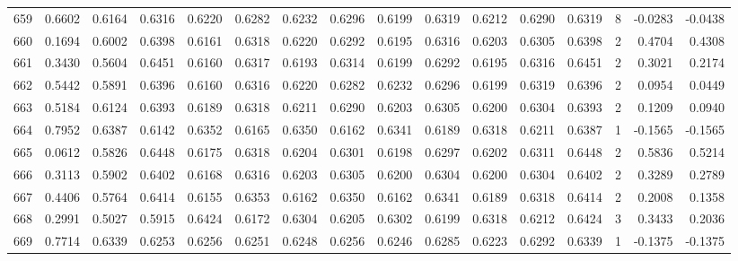 \begin{tabular}{lrrrrrrrrrrrrrrr}
659 &      0.6602 &  0.6164 &  0.6316 &  0.6220 &  0.6282 &  0.6232 &  0.6296 &  0.6199 &  0.6319 &  0.6212 &   0.6290 &     0.6319 &      8 &                   -0.0283 &                    -0.0438 \\
660 &      0.1694 &  0.6002 &  0.6398 &  0.6161 &  0.6318 &  0.6220 &  0.6292 &  0.6195 &  0.6316 &  0.6203 &   0.6305 &     0.6398 &      2 &                    0.4704 &                     0.4308 \\
661 &      0.3430 &  0.5604 &  0.6451 &  0.6160 &  0.6317 &  0.6193 &  0.6314 &  0.6199 &  0.6292 &  0.6195 &   0.6316 &     0.6451 &      2 &                    0.3021 &                     0.2174 \\
662 &      0.5442 &  0.5891 &  0.6396 &  0.6160 &  0.6316 &  0.6220 &  0.6282 &  0.6232 &  0.6296 &  0.6199 &   0.6319 &     0.6396 &      2 &                    0.0954 &                     0.0449 \\
663 &      0.5184 &  0.6124 &  0.6393 &  0.6189 &  0.6318 &  0.6211 &  0.6290 &  0.6203 &  0.6305 &  0.6200 &   0.6304 &     0.6393 &      2 &                    0.1209 &                     0.0940 \\
664 &      0.7952 &  0.6387 &  0.6142 &  0.6352 &  0.6165 &  0.6350 &  0.6162 &  0.6341 &  0.6189 &  0.6318 &   0.6211 &     0.6387 &      1 &                   -0.1565 &                    -0.1565 \\
665 &      0.0612 &  0.5826 &  0.6448 &  0.6175 &  0.6318 &  0.6204 &  0.6301 &  0.6198 &  0.6297 &  0.6202 &   0.6311 &     0.6448 &      2 &                    0.5836 &                     0.5214 \\
666 &      0.3113 &  0.5902 &  0.6402 &  0.6168 &  0.6316 &  0.6203 &  0.6305 &  0.6200 &  0.6304 &  0.6200 &   0.6304 &     0.6402 &      2 &                    0.3289 &                     0.2789 \\
667 &      0.4406 &  0.5764 &  0.6414 &  0.6155 &  0.6353 &  0.6162 &  0.6350 &  0.6162 &  0.6341 &  0.6189 &   0.6318 &     0.6414 &      2 &                    0.2008 &                     0.1358 \\
668 &      0.2991 &  0.5027 &  0.5915 &  0.6424 &  0.6172 &  0.6304 &  0.6205 &  0.6302 &  0.6199 &  0.6318 &   0.6212 &     0.6424 &      3 &                    0.3433 &                     0.2036 \\
669 &      0.7714 &  0.6339 &  0.6253 &  0.6256 &  0.6251 &  0.6248 &  0.6256 &  0.6246 &  0.6285 &  0.6223 &   0.6292 &     0.6339 &      1 &                   -0.1375 &                    -0.1375 \\

\end{tabular}
